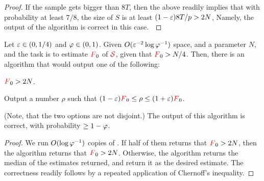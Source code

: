 \begin{proof}
    If the sample gets bigger than $8T$, then the above readily implies
    that with probability at least $7/8$, the size of $S$ is at least
    $(1-{\varepsilon})8T/p > 2N$, Namely, the output of the algorithm is
    correct in this case.~

\end{proof}
  
\begin{lemma}
    Let ${\varepsilon} \in (0,1/4)$ and $\varphi \in (0,1)$.  Given
    $O({\varepsilon}^{-2} \log \varphi^{-1})$ space, and a parameter $N$, and
    the task is to estimate ${\textcolor{red}{F}}_0$ of ${\textcolor{red}{\mathcal{S}}}$, given that
    ${\textcolor{red}{F}}_0 > N/4$.  Then, there is an algorithm that would output one
    of the following:
    \begin{compactenumA}
        \item ${\textcolor{red}{F}}_0 > 2N$.
        \item Output a number $\rho$ such that
        $(1-{\varepsilon}){\textcolor{red}{F}}_0 \leq \rho \leq (1+{\varepsilon}){\textcolor{red}{F}}_0$.
    \end{compactenumA}
    (Note, that the two options are not disjoint.)  The output of this
    algorithm is correct, with probability $\geq 1- \varphi$.
\end{lemma}

\begin{proof}
    We run $O( \log \varphi^{-1})$ copies of
    . If half of them returns that ${\textcolor{red}{F}}_0 > 2N$,
    then the algorithm returns that ${\textcolor{red}{F}}_0 > 2N$. Otherwise, the
    algorithm returns the median of the estimates returned, and return
    it as the desired estimate. The correctness readily follows by a
    repeated application of Chernoff's inequality.
\end{proof}




